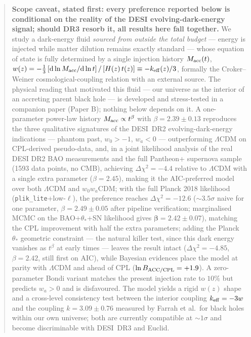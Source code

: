 \documentclass[11pt]{article}
\newcommand{\Macc}{M_{\rm acc}}
\newcommand{\keff}{k_{\rm eff}}
\begin{document}
\begin{abstract}
\textbf{Scope caveat, stated first: every preference reported below is conditional on the reality of the DESI evolving-dark-energy signal; should DR3 resorb it, all results here fall together.} We study a dark-energy fluid \emph{sourced from outside the total budget} --- energy is injected while matter dilution remains exactly standard --- whose equation of state is fully determined by a single injection history $\Macc(t)$, $w(z) = -\tfrac{1}{3}\,[\mathrm{d}\ln \Macc/\mathrm{d}\ln t]\,/\,[H(z)\,t(z)] \equiv -\keff(z)/3$, formally the Croker--Weiner cosmological-coupling relation with an external source. The physical reading that motivated this fluid --- our universe as the interior of an accreting parent black hole --- is developed and stress-tested in a companion paper (Paper B); nothing below depends on it. A one-parameter power-law history $\Macc \propto t^{\beta}$ with $\beta = 2.39 \pm 0.13$ reproduces the three qualitative signatures of the DESI~DR2 evolving-dark-energy indications --- phantom past, $w_0 > -1$, $w_a < 0$ --- outperforming $\Lambda$CDM on CPL-derived pseudo-data, and, in a joint likelihood analysis of the real DESI DR2 BAO measurements and the full Pantheon+ supernova sample (1593 data points, no CMB), achieving $\Delta\chi^2 = -4.4$ relative to $\Lambda$CDM with a single extra parameter ($\beta = 2.45$), making it the AIC-preferred model over both $\Lambda$CDM and $w_0w_a$CDM; with the full Planck 2018 likelihood (\texttt{plik\_lite}+low-$\ell$), the preference reaches $\Delta\chi^2 = -12.6$ ($\sim 3.5\sigma$ naive for one parameter, $\beta = 2.49 \pm 0.05$ after pipeline verification; marginalised MCMC on the BAO+$\theta_*$+SN likelihood gives $\boldsymbol{\beta = 2.42 \pm 0.07}$), matching the CPL improvement with half the extra parameters; adding the Planck $\theta_*$ geometric constraint --- the natural killer test, since this dark energy vanishes as $t^{\beta}$ at early times --- leaves the result intact ($\Delta\chi^2 = -4.85$, $\beta = 2.42$, still first on AIC), while Bayesian evidences place the model at parity with $\Lambda$CDM and ahead of CPL ($\ln B_{\rm ACC/CPL} = +1.9$). A zero-parameter Bondi variant matches the present injection rate to $10\%$ but predicts $w_a > 0$ and is disfavoured. The model yields a rigid $w(z)$ shape and a cross-level consistency test between the interior coupling $\keff = -3w$ and the coupling $k = 3.09 \pm 0.76$ measured by Farrah et al.\ for black holes within our own universe; both are currently compatible at $\sim 1\sigma$ and become discriminable with DESI~DR3 and Euclid.
\end{abstract}
\end{document}
